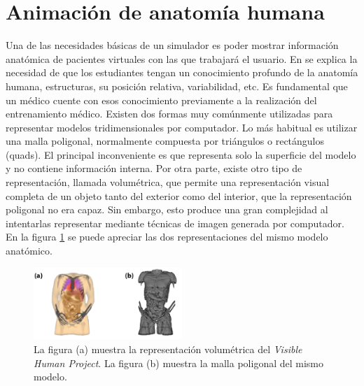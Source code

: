 \section{Animación de anatomía humana} 
\label{anatomy}



Una de las necesidades básicas de un simulador es poder mostrar información anatómica de pacientes virtuales con las que trabajará el usuario. En  \cite{preim2018survey} se explica la necesidad de que los estudiantes tengan un conocimiento profundo de la anatomía humana, estructuras, su posición relativa, variabilidad, etc. Es fundamental que un médico cuente con esos conocimiento previamente a la realización del entrenamiento médico.
Existen dos formas muy comúnmente utilizadas para representar modelos tridimensionales por computador. Lo más habitual es utilizar una malla poligonal, normalmente compuesta por triángulos o rectángulos (quads). El principal inconveniente es que representa solo la superficie del modelo y no contiene información interna.  %
Por otra parte, existe otro tipo de representación, llamada volumétrica, que permite una representación visual completa de un objeto tanto del exterior como del interior, que la representación poligonal no era capaz. Sin embargo, esto produce una gran complejidad al intentarlas representar mediante técnicas de imagen generada por computador.
En la figura \ref{fig:HVP} se puede apreciar las dos representaciones del mismo modelo anatómico.

\begin{figure}[h]
   \centering
    \includegraphics[width=0.5\textwidth]{IMG/volvsb-rep.png}
    \caption{La figura (a) muestra la representación volumétrica del \emph{Visible Human Project}\cite{ackerman1998visible}. La figura (b) muestra la malla poligonal del mismo modelo. }
   \label{fig:HVP}
\end{figure}



